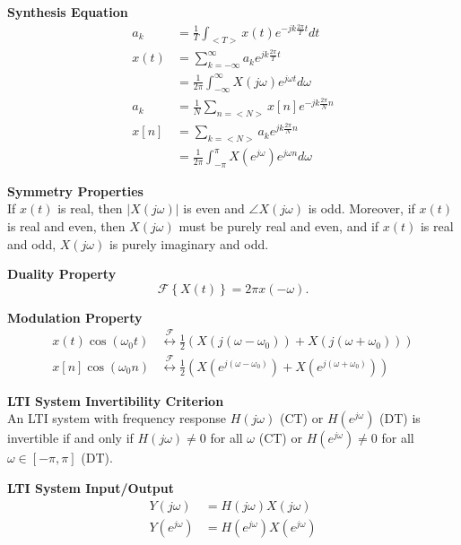 \documentclass{article}
\begin{document}
\begin{multicols}{2}
    \noindent\textbf{Synthesis Equation}
    \begin{align*}
        a_k  & = \frac{1}{T} \int_{<T>} x(t) e^{-jk\frac{2\pi}{T} t} dt                  \\
        x(t) & = \sum_{k=-\infty}^{\infty} a_k e^{jk\frac{2\pi}{T} t}                    \\
             & = \frac{1}{2\pi} \int_{-\infty}^{\infty} X(j\omega) e^{j\omega t} d\omega \\
        a_k  & = \frac{1}{N} \sum_{n=<N>} x[n] e^{-jk\frac{2\pi}{N}n}                    \\
        x[n] & = \sum_{k=<N>} a_k e^{jk\frac{2\pi}{N} n}                                 \\
             & = \frac{1}{2\pi} \int_{-\pi}^{\pi} X(e^{j\omega}) e^{j\omega n} d\omega
    \end{align*}

    \noindent\textbf{Symmetry Properties} \\
    If $x(t)$ is real, then $|X(j\omega)|$ is even and
    $\angle X(j\omega)$ is odd. Moreover, if $x(t)$ is real
    and even, then $X(j\omega)$ must be purely real and even,
    and if $x(t)$ is real and odd, $X(j\omega)$ is purely
    imaginary and odd.

    \noindent\textbf{Duality Property}
    \[ \label{eq:duality}
        \mathcal{F}\left\{ X(t) \right\} = 2\pi x(-\omega).
    \]

    \noindent\textbf{Modulation Property} \\
    \begin{align*}
        x(t)\cos(\omega_0 t) & \overset{\mathcal{F}}{\leftrightarrow} \frac{1}{2}\left( X(j(\omega-\omega_0)) + X(j(\omega+\omega_0))\right)          \\
        x[n]\cos(\omega_0 n) & \overset{\mathcal{F}}{\leftrightarrow}  \frac{1}{2}\left( X(e^{j(\omega-\omega_0)}) + X(e^{j(\omega+\omega_0)})\right)
    \end{align*}

    \noindent\textbf{LTI System Invertibility Criterion} \\
    An LTI system with frequency response $H(j\omega)$ (CT) or $H(e^{j\omega})$ (DT) is
    invertible if and only if $H(j\omega) \neq 0$ for all $\omega$ (CT) or $H(e^{j\omega})
        \neq 0$ for all $\omega \in [-\pi, \pi]$ (DT).

    \noindent\textbf{LTI System Input/Output}
    \begin{align*}
        Y(j\omega)     & = H(j\omega)X(j\omega)         \\
        Y(e^{j\omega}) & = H(e^{j\omega})X(e^{j\omega})
    \end{align*}


\end{multicols}
\end{document}
